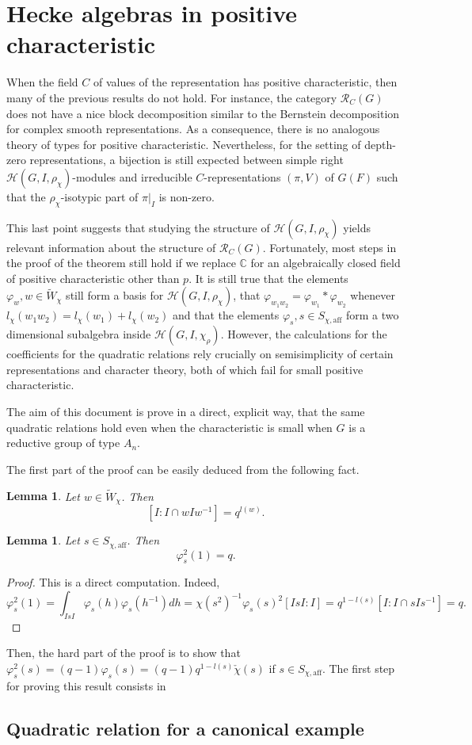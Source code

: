 \documentclass{article}
\newcommand{\aff}{\mathrm{aff}}
\newcommand{\calpha}{\check{\alpha}}
\newcommand{\cR}{\mathcal{R}}
\newcommand{\cH}{\mathcal{H}}
\newcommand{\CC}{\mathbb{C}}
\theoremstyle{plain}
\newtheorem{lemma}[theorem]{Lemma}
\theoremstyle{definition}
\begin{document}
    \section{Hecke algebras in positive characteristic}
    
    When the field $C$ of values of the representation has positive characteristic, then many of the previous results do not hold. For instance, the category $\cR_C(G)$ does not have a nice block decomposition similar to the Bernstein decomposition for complex smooth representations. As a consequence, there is no analogous theory of types for positive characteristic. Nevertheless, for the setting of depth-zero representations, a bijection is still expected between simple right $\cH(G,I,\rho_\chi)$-modules and irreducible $C$-representations $(\pi,V)$ of $G(F)$ such that the $\rho_\chi$-isotypic part of $\pi|_I$ is non-zero. 

    This last point suggests that studying the structure of $\cH(G,I,\rho_\chi)$ yields relevant information about the structure of $\cR_C(G)$. Fortunately, most steps in the proof of the theorem still hold if we replace $\CC$ for an algebraically closed field of positive characteristic other than $p$. It is still true that the elements $\varphi_w, w\in\tilde{W}_\chi$ still form a basis for $\cH(G,I,\rho_\chi)$, that $\varphi_{w_1w_2}=\varphi_{w_1}*\varphi_{w_2}$ whenever $l_\chi(w_1w_2)=l_\chi(w_1)+l_\chi(w_2)$ and that the elements $\varphi_s, s\in S_{\chi,\aff}$ form a two dimensional subalgebra inside $\cH(G,I,\chi_\rho)$. However, the calculations for the coefficients for the quadratic relations rely crucially on semisimplicity of certain representations and character theory, both of which fail for small positive characteristic. 

    The aim of this document is prove in a direct, explicit way, that the same quadratic relations hold even when the characteristic is small when $G$ is a reductive group of type $A_n$.

    The first part of the proof can be easily deduced from the following fact.

    \begin{lemma}
        Let $w\in\tilde{W}_\chi$. Then
        $$[I:I\cap wIw^{-1}]=q^{l(w)}.$$
    \end{lemma}

    \begin{lemma}
        Let $s\in S_{\chi,\aff}$. Then
        $$\varphi_s^2(1)=q.$$
    \end{lemma}
    \begin{proof}
        This is a direct computation. Indeed,
        \begin{equation*}
            \varphi_s^2(1)=\int_{IsI}\varphi_s(h)\varphi_s(h^{-1})dh=\chi(s^2)^{-1}\varphi_s(s)^2[IsI:I]=q^{1-l(s)}[I:I\cap sIs^{-1}]=q.
        \end{equation*}
    \end{proof}

    Then, the hard part of the proof is to show that $\varphi_s^2(s)=(q-1)\varphi_s(s)=(q-1)q^{1-l(s)}\check{\chi}(s)$ if $s\in S_{\chi,\aff}$.
    The first step for proving this result consists in 

    \subsection{Quadratic relation for a canonical example}
\end{document}
